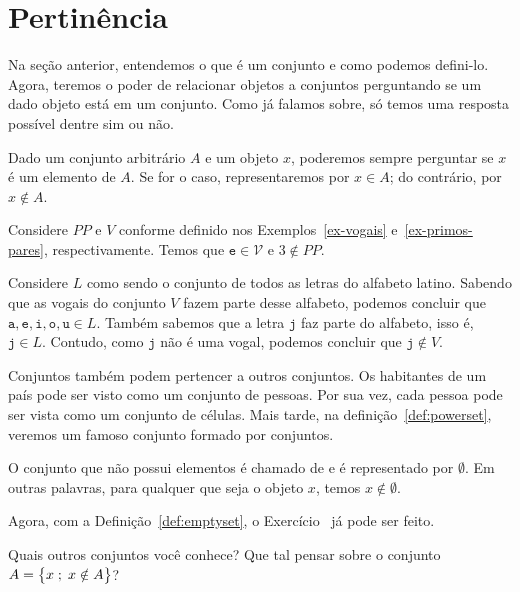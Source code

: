 \section{Pertinência}

Na seção anterior, entendemos o que é um conjunto e como podemos defini-lo.
Agora, teremos o poder de relacionar objetos a conjuntos perguntando se um dado objeto está em um conjunto.
Como já falamos sobre, só temos uma resposta possível dentre sim ou não.

\begin{definition}
\label{def:in}
Dado um conjunto arbitrário $A$ e um objeto $x$,
poderemos sempre perguntar se $x$ é um elemento de $A$. Se for o caso, representaremos por $x \in A$; do contrário, por $x \notin A$.
\end{definition}

\begin{example}
Considere $PP$ e $V$ conforme definido nos Exemplos~\ref{ex-vogais} e~\ref{ex-primos-pares}, respectivamente. Temos que $\texttt{e} \in \mathcal{V}$ e $3 \notin PP$.
\end{example}

\begin{example}
Considere $L$ como sendo o conjunto de todos as letras do alfabeto latino.
Sabendo que as vogais do conjunto $V$ fazem parte desse alfabeto, podemos concluir que $\texttt{a}, \texttt{e}, \texttt{i}, \texttt{o}, \texttt{u} \in L$.
Também sabemos que a letra $\texttt{j}$ faz parte do alfabeto, isso é, $\texttt{j} \in L$.
Contudo, como $\texttt{j}$ não é uma vogal, podemos concluir que $\texttt{j} \notin V$.

\end{example}

\begin{example}
Conjuntos também podem pertencer a outros conjuntos.
Os habitantes de um país pode ser visto como um conjunto de pessoas.
Por sua vez, cada pessoa pode ser vista como um conjunto de células.
Mais tarde, na definição~\ref{def:powerset}, veremos um famoso conjunto formado por conjuntos.
\end{example}

\begin{definition}
\label{def:emptyset}
O conjunto que não possui elementos é chamado de  e é representado por $\emptyset$.
Em outras palavras, para qualquer que seja o objeto $x$, temos $x \notin \emptyset$.
\end{definition}

Agora, com a Definição~\ref{def:emptyset}, o Exercício~ já pode ser feito.

\begin{example}
Quais outros conjuntos você conhece? Que tal pensar sobre o conjunto $A = \left\{ x \;;\; x \notin A\right\}$?
\end{example}

